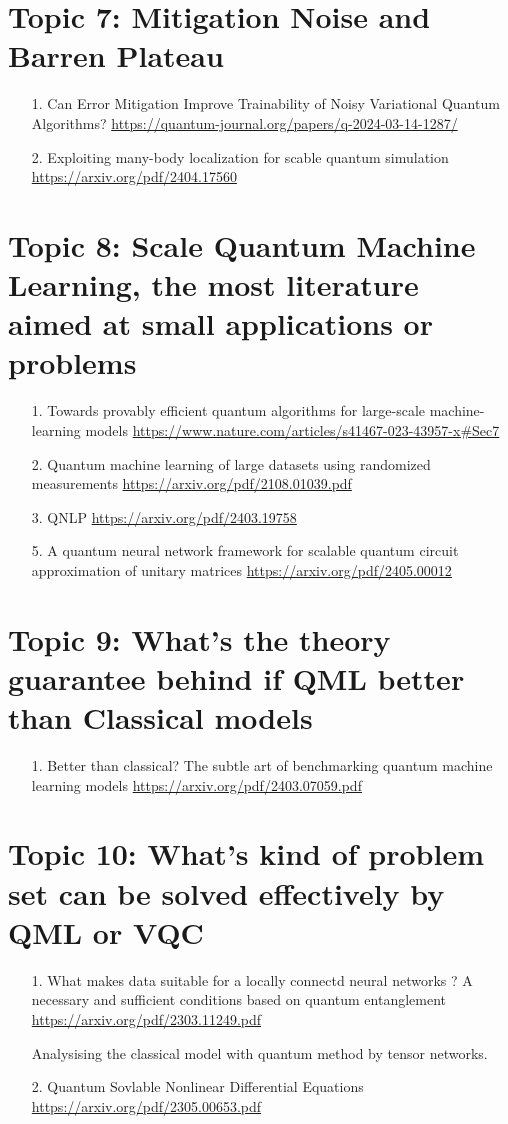 \documentclass[12pt, oneside]{article}   	%
\begin{document}
\section{Topic 7: Mitigation Noise and Barren Plateau}
\begin{itemize}
\item[1. ] Can Error Mitigation Improve Trainability of Noisy Variational Quantum Algorithms? \url{https://quantum-journal.org/papers/q-2024-03-14-1287/}
\item [2. ] Exploiting many-body localization for scable quantum simulation \url{https://arxiv.org/pdf/2404.17560}
\end{itemize}
\section{Topic 8: Scale Quantum Machine Learning, the most literature aimed at small applications or problems}
\begin{itemize}
\item[1. ] Towards provably efficient quantum algorithms for large-scale machine-learning models \url{https://www.nature.com/articles/s41467-023-43957-x#Sec7}
\item[2. ] Quantum machine learning of large datasets using randomized measurements \url{https://arxiv.org/pdf/2108.01039.pdf}
\item[3. ] QNLP \url{https://arxiv.org/pdf/2403.19758}
\item[5. ] A quantum neural network framework for scalable quantum circuit approximation of unitary matrices \url{https://arxiv.org/pdf/2405.00012}
\end{itemize}
\section{Topic 9: What's the theory guarantee behind if QML better than Classical models}
\begin{itemize}
\item[1. ]Better than classical? The subtle art of benchmarking	quantum machine learning models \url{https://arxiv.org/pdf/2403.07059.pdf}
\end{itemize}
\section{Topic 10: What's kind of problem set can be solved effectively  by QML or VQC}
\begin{itemize}
	\item [1.] What makes data suitable for a locally connectd neural networks ? A necessary and sufficient conditions based on quantum entanglement \url{https://arxiv.org/pdf/2303.11249.pdf}
	\par Analysising the classical model with quantum method by tensor networks.
	\item[2. ] Quantum Sovlable Nonlinear Differential Equations \url{https://arxiv.org/pdf/2305.00653.pdf}
\end{itemize}
\end{document}

